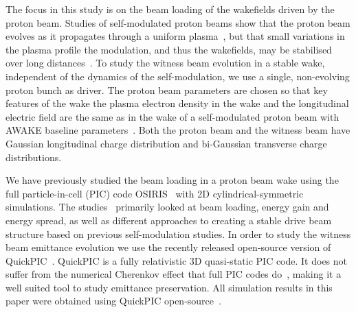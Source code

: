 \documentclass[aps,prstab,reprint,amsmath,amssymb,groupedaddress]{revtex4-1}
\begin{document}
The focus in this study is on the beam loading of the wakefields driven by the proton beam. Studies of self-modulated
proton beams show that the proton beam evolves as it propagates through a uniform plasma~\cite{lotov:2011}, but that
small variations in the plasma profile the modulation, and thus the wakefields, may be stabilised over long
distances~\cite{lotov:2011, lotov:2015, caldwell:2011}. To study the witness beam evolution in a stable wake,
independent of the dynamics of the self-modulation, we use a single, non-evolving proton bunch as driver. The proton
beam parameters are chosen so that key features of the wake \textendash the plasma electron density in the wake and the
longitudinal electric field \textendash are the same as in the wake of a self-modulated proton beam with AWAKE baseline
parameters~\cite{gschwendtner:2016}. Both the proton beam and the witness beam have Gaussian longitudinal charge
distribution and bi-Gaussian transverse charge distributions.

We have previously studied the beam loading in a proton beam wake using the full particle-in-cell (PIC) code
OSIRIS~\cite{fonseca:2002} with 2D cylindrical-symmetric simulations. The studies~\cite{berglyd_olsen:2015,
berglyd_olsen:2016} primarily looked at beam loading, energy gain and energy spread, as well as different approaches to
creating a stable drive beam structure based on previous self-modulation studies. In order to study the witness beam
emittance evolution we use the recently released open-source version of QuickPIC~\cite{huang:2006, an:2013}. QuickPIC is
a fully relativistic 3D quasi-static PIC code. It does not suffer from the numerical Cherenkov effect that full PIC
codes do~\cite{godfrey:1974,lehe:2013}, making it a well suited tool to study emittance preservation. All simulation
results in this paper were obtained using QuickPIC open-source~\cite{quickpic:web}.

\end{document}
